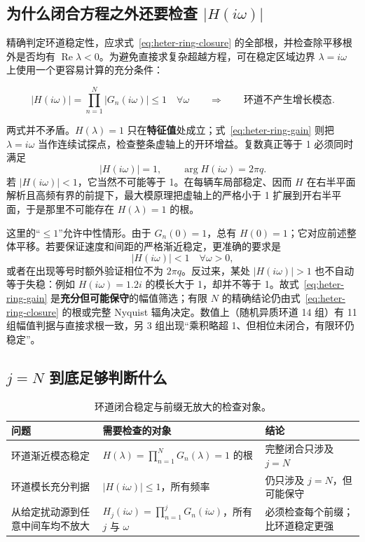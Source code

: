 \documentclass[11pt,a4paper,openany]{book}
\numberwithin{equation}{chapter}
\numberwithin{figure}{chapter}
\numberwithin{table}{chapter}
\begin{document}
\subsection{为什么闭合方程之外还要检查 $|H(i\omega)|$}

精确判定环道稳定性，应求式~\eqref{eq:heter-ring-closure} 的全部根，并检查除平移根外是否均有 $\operatorname{Re}\lambda<0$。为避免直接求复杂超越方程，可在稳定区域边界 $\lambda=i\omega$ 上使用一个更容易计算的充分条件：

\begin{tcolorbox}[keybox,title=\textbf{环道的模长充分条件}]
\begin{equation}
\left|H(i\omega)\right|
=\prod_{n=1}^{N}\left|G_n(i\omega)\right| \le 1
\quad \forall\omega
\qquad\Longrightarrow\qquad \text{环道不产生增长模态}.
\label{eq:heter-ring-gain}
\end{equation}
\end{tcolorbox}

两式并不矛盾。$H(\lambda)=1$ 只在\textbf{特征值}处成立；式~\eqref{eq:heter-ring-gain} 则把 $\lambda=i\omega$ 当作连续试探点，检查整条虚轴上的开环增益。复数真正等于 1 必须同时满足
\[
|H(i\omega)|=1,
\qquad
\arg H(i\omega)=2\pi q.
\]
若 $|H(i\omega)|<1$，它当然不可能等于 1。在每辆车局部稳定、因而 $H$ 在右半平面解析且高频有界的前提下，最大模原理把虚轴上的严格小于 1 扩展到开右半平面，于是那里不可能存在 $H(\lambda)=1$ 的根。

这里的“$\le1$”允许中性情形。由于 $G_n(0)=1$，总有 $H(0)=1$；它对应前述整体平移。若要保证速度和间距的严格渐近稳定，更准确的要求是
\[
|H(i\omega)|<1\quad \forall\omega>0,
\]
或者在出现等号时额外验证相位不为 $2\pi q$。反过来，某处 $|H(i\omega)|>1$ 也不自动等于失稳：例如 $H(i\omega)=1.2i$ 的模长大于 1，却并不等于 1。故式~\eqref{eq:heter-ring-gain} 是\textbf{充分但可能保守}的幅值筛选；有限 $N$ 的精确结论仍由式~\eqref{eq:heter-ring-closure} 的根或完整 Nyquist 辐角决定。数值上（随机异质环道 14 组）有 11 组幅值判据与直接求根一致，另 3 组出现“乘积略超 1、但相位未闭合，有限环仍稳定”。

\subsection{$j=N$ 到底足够判断什么}

\begin{table}[htbp]
\centering
\small
\caption{环道闭合稳定与前缀无放大的检查对象。}
\label{tab:ring-versus-prefix}
\begin{tabular}{p{3.5cm}p{5.0cm}p{5.2cm}}
\toprule
\textbf{问题} & \textbf{需要检查的对象} & \textbf{结论} \\
\midrule
环道渐近模态稳定 & $H(\lambda)=\prod_{n=1}^{N}G_n(\lambda)=1$ 的根 & 完整闭合只涉及 $j=N$ \\[4pt]
环道模长充分判据 & $|H(i\omega)|\le1$，所有频率 & 仍只涉及 $j=N$，但可能保守 \\[4pt]
从给定扰动源到任意中间车均不放大 & $H_j(i\omega)=\prod_{n=1}^{j}G_n(i\omega)$，所有 $j$ 与 $\omega$ & 必须检查每个前缀；比环道稳定更强 \\
\bottomrule
\end{tabular}
\end{table}
\end{document}
